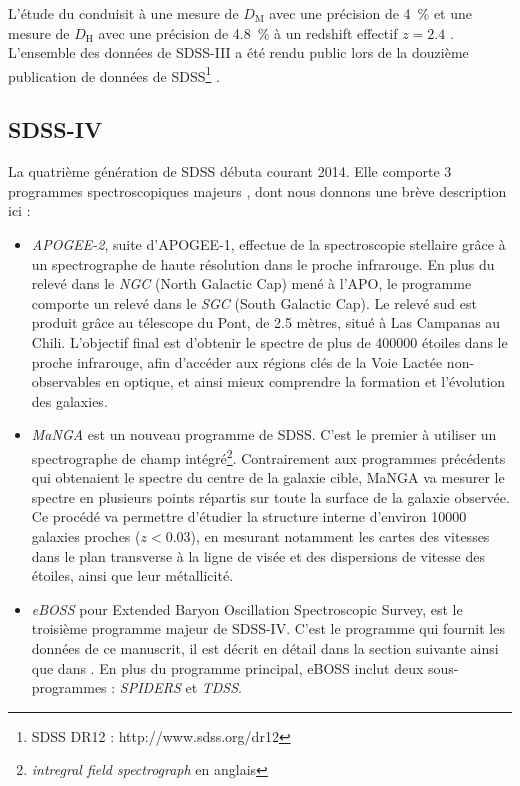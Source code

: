 L'étude du \lya{} conduisit à une mesure de $D_{\mathrm{M}}$ avec une précision de \SI{4}{\percent} et une mesure de $D_{\mathrm{H}}$ avec une précision de \SI{4.8}{\percent} à un redshift effectif $z=\num{2,4}$ \autocite{DuMasdesBourboux2017}.
L'ensemble des données de SDSS-III a été rendu public lors de la douzième publication de données de SDSS\footnote{SDSS DR12 : http://www.sdss.org/dr12} \autocite{Alam2015}.


\subsection{SDSS-IV}

La quatrième génération de SDSS débuta courant 2014. Elle comporte 3 programmes spectroscopiques majeurs \autocite{Blanton2017}, dont nous donnons une brève description ici :
\begin{itemize}
\item \emph{APOGEE-2}, suite d'APOGEE-1, effectue de la spectroscopie stellaire grâce à un spectrographe de haute résolution dans le proche infrarouge. En plus du relevé dans le \emph{NGC} (North Galactic Cap) mené à l'APO, le programme comporte un relevé dans le \emph{SGC} (South Galactic Cap). Le relevé sud est produit grâce au télescope du Pont, de \num{2,5} mètres, situé à Las Campanas au Chili. L'objectif final est d'obtenir le spectre de plus de \num{400000} étoiles dans le proche infrarouge, afin d'accéder aux régions clés de la Voie Lactée non-observables en optique, et ainsi mieux comprendre la formation et l'évolution des galaxies.
\item \emph{MaNGA} est un nouveau programme de SDSS. C'est le premier à utiliser un spectrographe de champ intégré\footnote{\emph{intregral field spectrograph} en anglais}. Contrairement aux programmes précédents qui obtenaient le spectre du centre de la galaxie cible, MaNGA va mesurer le spectre en plusieurs points répartis sur toute la surface de la galaxie observée. Ce procédé va permettre d'étudier la structure interne d'environ \num{10000} galaxies proches ($z < \num{0,03}$), en mesurant notamment les cartes des vitesses dans le plan transverse à la ligne de visée et des dispersions de vitesse des étoiles, ainsi que leur  métallicité.
\item \emph{eBOSS} pour Extended Baryon Oscillation Spectroscopic Survey, est le troisième programme majeur de SDSS-IV. C'est le programme qui fournit les données de ce manuscrit, il est décrit en détail dans la section suivante ainsi que dans \textcite{Dawson2015}. En plus du programme principal, eBOSS inclut deux sous-programmes : \emph{SPIDERS} et \emph{TDSS}.
  

\end{itemize}
